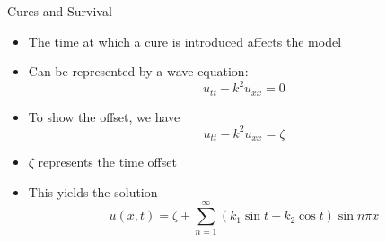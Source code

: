 \documentclass{beamer}
\begin{document}

\begin{frame}{Cures and Survival}
\begin{itemize}
\item The time at which a cure is introduced affects the model
\pause
\item Can be represented by a wave equation:
\[
u_{tt}-k^{2}u_{xx}=0
\]
\pause
\item To show the offset, we have
\[
u_{tt}-k^{2}u_{xx}=\zeta
\]
\pause
\item $\zeta$ represents the time offset
\pause
\item This yields the solution
\[
u(x,t)=\zeta+\sum_{n=1}^{\infty}(k_{1}\sin{t}+k_{2}\cos{t})\sin{n\pi x}
\]
\end{itemize}
\end{frame}
\end{document}

